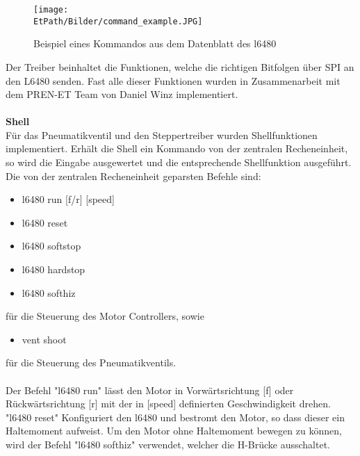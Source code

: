 	\begin{figure}[h!]
		\centering
		\texttt{[image: \\EtPath/Bilder/command\_example.JPG]}
		\caption{Beispiel eines Kommandos aus dem Datenblatt des l6480}
		\label{fig:command}
	\end{figure}
	Der Treiber beinhaltet die Funktionen, welche die richtigen Bitfolgen über SPI an den L6480 senden. Fast alle dieser Funktionen wurden in Zusammenarbeit mit dem PREN-ET Team von Daniel Winz implementiert.  
	\\\\
	\textbf{Shell}\\
	Für das Pneumatikventil und den Steppertreiber wurden Shellfunktionen implementiert. Erhält die Shell ein Kommando von der zentralen Recheneinheit, so wird die Eingabe ausgewertet und die entsprechende Shellfunktion ausgeführt. Die von der zentralen Recheneinheit geparsten Befehle sind:  
	\begin{itemize}
		\item l6480 run [f/r] [speed]
		\item l6480 reset
		\item l6480 softstop
		\item l6480 hardstop
		\item l6480 softhiz
	\end{itemize}
	für die Steuerung des Motor Controllers, sowie
	\begin{itemize}
		\item vent shoot
	\end{itemize}
	für die Steuerung des Pneumatikventils. 
	\\\\
	Der Befehl "l6480 run" lässt den Motor in Vorwärtsrichtung [f] oder Rückwärtsrichtung [r] mit der in [speed] definierten Geschwindigkeit drehen. "l6480 reset" Konfiguriert den l6480 und bestromt den Motor, so dass dieser ein Haltemoment aufweist. Um den Motor ohne Haltemoment bewegen zu können, wird der Befehl "l6480 softhiz" verwendet, welcher die H-Brücke ausschaltet. 
	